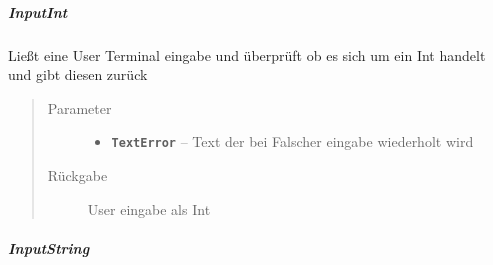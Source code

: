 \documentclass[letterpaper,10pt,ngerman]{sphinxmanual}
\begin{document}
\subparagraph{InputInt}
\label{com/linuxluigi/polynomial/TerminalInterface:inputint}

\begin{fulllineitems}
\label{com/linuxluigi/polynomial/TerminalInterface:com.linuxluigi.polynomial.TerminalInterface.InputInt(String)}
Ließt eine User Terminal eingabe und überprüft ob es sich um ein Int handelt und gibt diesen zurück
\begin{quote}\begin{description}
\item[{Parameter}] \leavevmode\begin{itemize}
\item {} 
\textbf{\texttt{TextError}} -- Text der bei Falscher eingabe wiederholt wird

\end{itemize}

\item[{Rückgabe}] \leavevmode
User eingabe als Int

\end{description}\end{quote}

\end{fulllineitems}



\subparagraph{InputString}
\label{com/linuxluigi/polynomial/TerminalInterface:inputstring}
\end{document}
